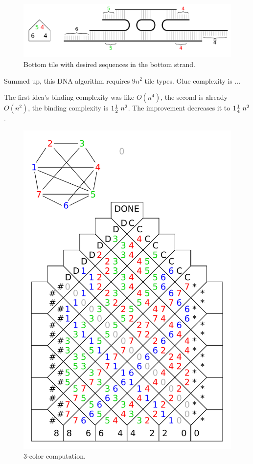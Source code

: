 \begin{figure}[H]
\begin{center}
	\includegraphics[scale=0.75]{./figures/3-color/bottom_tile.pdf}
	\caption{Bottom tile with desired sequences in the bottom strand.}
	\label{fig:bottom_tile}
\end{center}
\end{figure}
Summed up, this DNA algorithm requires $9n^2$ tile types. Glue complexity is ...

The first idea's binding complexity was like $O(n^4)$, the second is already $O(n^2)$, the binding complexity is $1\nicefrac{1}{2}\;n^2$. The improvement decreases it to $1\nicefrac{1}{4}\;n^2$.

\begin{figure}[H]
\begin{center}
	\includegraphics[scale=0.75]{./figures/3-color/3-color.pdf}
	\caption{3-color computation.}
	\label{fig:3-color}
\end{center}
\end{figure}
